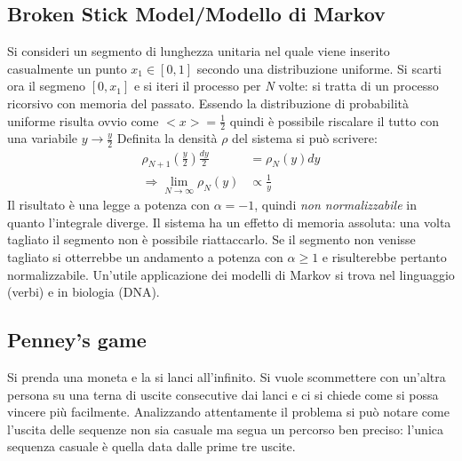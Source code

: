 \documentclass[12pt, a4paper]{book}
\theoremstyle{theorem}
\begin{document}
			\subsection{Broken Stick Model/Modello di Markov}
				Si consideri un segmento di lunghezza unitaria nel quale viene inserito casualmente un punto $x_1\in[0,1]$ secondo una distribuzione uniforme.
				Si scarti ora il segmeno $[0,x_1]$ e si iteri il processo per \textit{N} volte: si tratta di un processo ricorsivo con memoria del passato.
				Essendo la distribuzione di probabilità uniforme risulta ovvio come $<x>=\frac{1}{2}$ quindi è possibile riscalare il tutto con una variabile $y\rightarrow\frac{y}{2}$
				Definita la densità $\rho$ del sistema si può scrivere:
				\begin{equation*}
					\begin{split}
						\rho_{N+1}\left(\frac{y}{2}\right)\frac{dy}{2}&=\rho_N(y)dy\\
						\Rightarrow\lim_{N\to\infty}\rho_N(y)&\propto\frac{1}{y}
					\end{split}
				\end{equation*}
				Il risultato è una legge a potenza con $\alpha=-1$, quindi \textit{non normalizzabile} in quanto l'integrale diverge.
				Il sistema ha un effetto di memoria assoluta: una volta tagliato il segmento non è possibile riattaccarlo.
				Se il segmento non venisse tagliato si otterrebbe un andamento a potenza con $\alpha\geq 1$ e risulterebbe pertanto normalizzabile.
				Un'utile applicazione dei modelli di Markov si trova nel linguaggio (verbi) e in biologia (DNA).
			\subsection{Penney's game}
				Si prenda una moneta e la si lanci all'infinito.
				Si vuole scommettere con un'altra persona su una terna di uscite consecutive dai lanci e ci si chiede come si possa vincere più facilmente.
				Analizzando attentamente il problema si può notare come l'uscita delle sequenze non sia casuale ma segua un percorso ben preciso: l'unica sequenza casuale è quella data dalle prime tre uscite.
							
\end{document}
